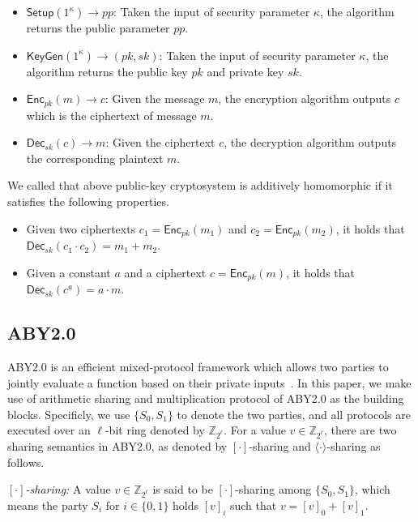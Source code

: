 \documentclass[conference]{IEEEtran}
\begin{document}
\begin{itemize}
  \item $\mathsf{Setup}(1^\kappa)\to pp$: Taken the input of security parameter $\kappa$, the algorithm returns the public parameter $pp$.
  \item $\mathsf{KeyGen}(1^\kappa)\to (pk, sk)$: Taken the input of security parameter $\kappa$, the algorithm returns the public key $pk$ and private key $sk$.
  \item $\mathsf{Enc}_{pk}(m)\to c$: Given the message $m$, the encryption algorithm outputs $c$ which is the ciphertext of message $m$.
  \item $\mathsf{Dec}_{sk}(c)\to m$: Given the ciphertext $c$, the decryption algorithm outputs the corresponding plaintext $m$.
\end{itemize}

We called that above public-key cryptosystem is additively homomorphic if it satisfies the following properties.

\begin{itemize}
  \item Given two ciphertexts $c_1 = \mathsf{Enc}_{pk}(m_1)$ and $c_2 = \mathsf{Enc}_{pk}(m_2)$, it holds that $\mathsf{Dec}_{sk}(c_1 \cdot c_2) = m_1 + m_2$.
  \item Given a constant $a$ and a ciphertext $c=\mathsf{Enc}_{pk}(m)$, it holds that $\mathsf{Dec}_{sk}(c^a) = a\cdot m$.
\end{itemize}


\iffalse
\subsection{ABY2.0}

ABY2.0 is an efficient mixed-protocol framework which allows two parties to jointly evaluate a function based on their private inputs~\cite{patra_aby20_2020}.
In this paper, we make use of arithmetic sharing and multiplication protocol of ABY2.0 as the building blocks.
Specificly, we use $\{S_0, S_1\}$ to denote the two parties, and all protocols are executed over an $\ell$-bit ring denoted by $\mathbb{Z}_{2^\ell}$.
For a value $v\in\mathbb{Z}_{2^\ell}$, there are two sharing semantics in ABY2.0, as denoted by $[\cdot]$-sharing and $\langle \cdot \rangle$-sharing as follows.

\textit{$[\cdot]$-sharing:} A value $v\in\mathbb{Z}_{2^\ell}$ is said to be $[\cdot]$-sharing among $\{S_0, S_1\}$, which means the party $S_i$ for $i\in\{0,1\}$ holds $[v]_i$ such that $v = [v]_0 + [v]_1$.
\end{document}
